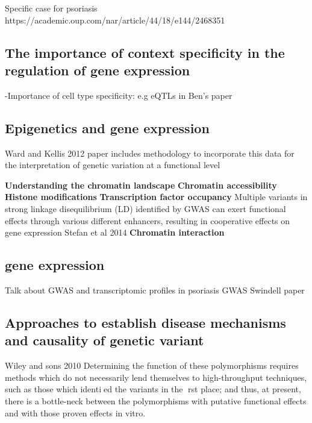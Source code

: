 Specific case for psoriasis https://academic.oup.com/nar/article/44/18/e144/2468351








\subsection{The importance of context specificity in the regulation of gene expression}
-Importance of cell type specificity: e.g eQTLs in Ben's paper

\subsection{Epigenetics and gene expression}
Ward and Kellis 2012 paper includes methodology to incorporate this data for the interpretation of genetic variation at a functional level

\textbf{Understanding the chromatin landscape}
\textbf{Chromatin accessibility}
\textbf{Histone modifications}
\textbf{Transcription factor occupancy}
Multiple   variants   in   strong   linkage   disequilibrium   (LD)
 identified by GWAS can exert functional effects through
 various different enhancers, resulting in cooperative effects
 on gene expression  Stefan et al 2014
\textbf{Chromatin interaction}

\subsection{gene expression}
Talk about GWAS and transcriptomic profiles in psoriasis GWAS Swindell paper
\subsection{Approaches to establish disease mechanisms and causality of genetic variant}
Wiley and sons 2010
Determining the function of these polymorphisms requires methods which do not   necessarily   lend   themselves   to   high-throughput techniques, such as those which identied the variants in the rst place; and thus, at present, there is a bottle-neck between the polymorphisms with putative functional effects and with those proven effects in vitro.






